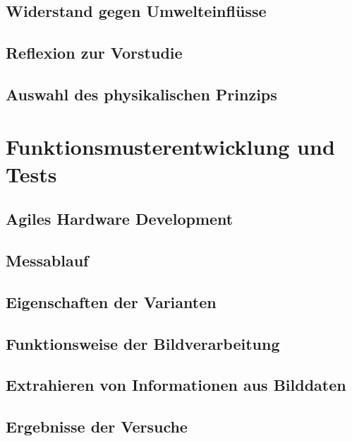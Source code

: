 \documentclass[a4paper,12pt]{article}
\begin{document}
\newpage
\subsection{Widerstand gegen Umwelteinflüsse}


\subsection{Reflexion zur Vorstudie}


\newpage
\subsection{Auswahl des physikalischen Prinzips}


\section{Funktionsmusterentwicklung und Tests}


\subsection{Agiles Hardware Development}


\subsection{Messablauf}
\label{sec:Mess}


\subsection{Eigenschaften der Varianten}


\newpage
\subsection{Funktionsweise der Bildverarbeitung}


\subsection{Extrahieren von Informationen aus Bilddaten}
\label{sec:DB}



\newpage
\subsection{Ergebnisse der Versuche}

\end{document}

